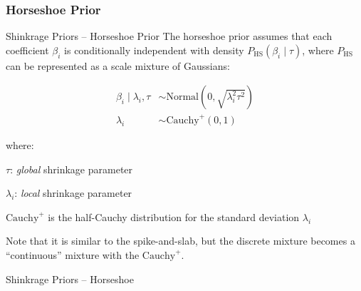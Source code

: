 \subsubsection{Horseshoe Prior}
\begin{frame}{Shinkrage Priors -- Horseshoe Prior}
    The horseshoe prior\parencite{carvalho2009handling} assumes that each coefficient
    $\beta_i$ is conditionally independent with density
    $P_{\text{HS}}(\beta_i \mid \tau )$, where $P_{\text{HS}}$
    can be represented as a scale mixture of Gaussians:

    $$
        \begin{aligned}
            \beta_i \mid \lambda_i, \tau &\sim \text{Normal} \left( 0, \sqrt{\lambda_i^2 \tau^2} \right) \\
            \lambda_i &\sim \text{Cauchy}^+ (0, 1)
        \end{aligned}
    $$

    where:
    \begin{vfilleditems}
        \item $\tau$: \textit{global} shrinkage parameter
        \item $\lambda_i$: \textit{local} shrinkage parameter
        \item $\text{Cauchy}^+$ is the half-Cauchy distribution for the
            standard deviation $\lambda_i$
    \end{vfilleditems}

    \vfill

    \small
    Note that it is similar to the spike-and-slab, but the discrete mixture becomes
    a ``continuous'' mixture with the $\text{Cauchy}^+$.
\end{frame}

\begin{frame}{Shinkrage Priors -- Horseshoe}
	\centering
\end{frame}

